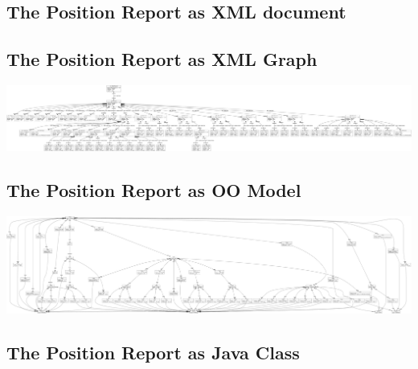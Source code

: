 \documentclass[submission]{eptcs}
\begin{document}
\subsection{The Position Report as XML document}
\label{sec:posrpt:xml}


\newpage
\subsection{The Position Report as XML Graph}
\label{sec:posrpt:xml-graph}
\begin{center}
  \includegraphics[angle=90,height=.95\textheight]{xml-test2}
\end{center}

\newpage
\subsection{The Position Report as OO Model}
\label{sec:posrpt:oo}
\begin{center}
  \includegraphics[angle=90,height=.95\textheight]{oo-test2}
\end{center}

\newpage
\subsection{The Position Report as Java Class}
\label{sec:posrpt:java}
\end{document}

